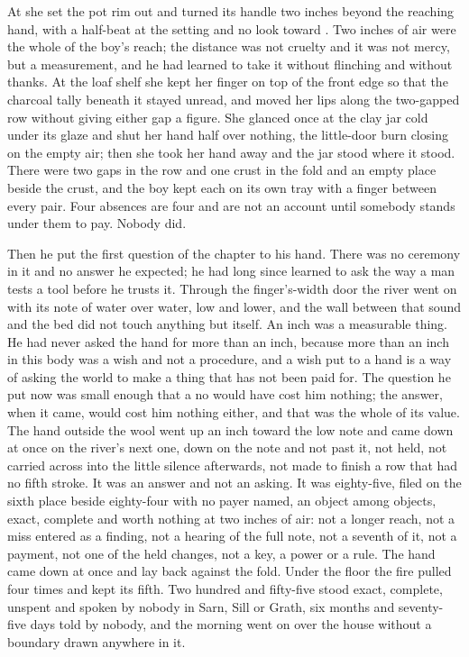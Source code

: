 \scenebreak

At  she set the pot rim out and turned its handle two inches beyond the reaching hand, with a half-beat at the setting and no look toward . Two inches of air were the whole of the boy's reach; the distance was not cruelty and it was not mercy, but a measurement, and he had learned to take it without flinching and without thanks. At the loaf shelf she kept her finger on top of the front edge so that the charcoal tally beneath it stayed unread, and moved her lips along the two-gapped row without giving either gap a figure. She glanced once at the clay jar cold under its glaze and shut her hand half over nothing, the little-door burn closing on the empty air; then she took her hand away and the jar stood where it stood. There were two gaps in the row and one crust in the fold and an empty place beside the crust, and the boy kept each on its own tray with a finger between every pair. Four absences are four and are not an account until somebody stands under them to pay. Nobody did.

\scenebreak

Then he put the first question of the chapter to his hand. There was no ceremony in it and no answer he expected; he had long since learned to ask the way a man tests a tool before he trusts it. Through the finger's-width door the river went on with its note of water over water, low and lower, and the wall between that sound and the bed did not touch anything but itself. An inch was a measurable thing. He had never asked the hand for more than an inch, because more than an inch in this body was a wish and not a procedure, and a wish put to a hand is a way of asking the world to make a thing that has not been paid for. The question he put now was small enough that a no would have cost him nothing; the answer, when it came, would cost him nothing either, and that was the whole of its value. The hand outside the wool went up an inch toward the low note and came down at once on the river's next one, down on the note and not past it, not held, not carried across into the little silence afterwards, not made to finish a row that had no fifth stroke. It was an answer and not an asking. It was eighty-five, filed on the sixth place beside eighty-four with no payer named, an object among objects, exact, complete and worth nothing at two inches of air: not a longer reach, not a miss entered as a finding, not a hearing of the full note, not a seventh of it, not a payment, not one of the held changes, not a key, a power or a rule. The hand came down at once and lay back against the fold. Under the floor the fire pulled four times and kept its fifth. Two hundred and fifty-five stood exact, complete, unspent and spoken by nobody in Sarn, Sill or Grath, six months and seventy-five days told by nobody, and the morning went on over the house without a boundary drawn anywhere in it.
